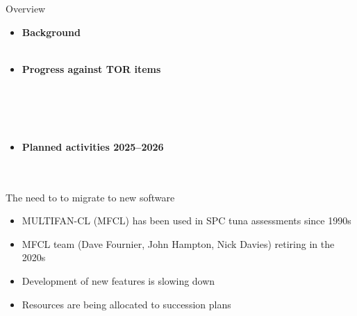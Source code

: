 \documentclass[aspectratio=169,fleqn]{beamer}
\begin{document}
\begin{frame}{Overview}
  \begin{itemize}
    \item[] {\bf\darkblue Background}\\[0.1ex]
    \\[4ex]
    \item[] {\bf\darkblue Progress against TOR items}\\[0.1ex]
    \\[0.1ex]
    \\[0.1ex]
    \\[0.1ex]
    \\[4ex]
    \item[] {\bf\darkblue Planned activities 2025--2026}\\[0.1ex]
    \\[0.1ex]
    \\[2ex]
  \end{itemize}
\end{frame}


\begin{frame}{The need to to migrate to new software}
  \begin{itemize}
    \item[] MULTIFAN-CL (MFCL) has been used in SPC tuna assessments since
    1990s\\[4ex]
    \item[] MFCL team (Dave Fournier, John Hampton, Nick Davies) retiring in the
    2020s\\[4ex]
    \item[] Development of new features is slowing down\\[4ex]
    \item[] Resources are being allocated to succession plans\\[2ex]
  \end{itemize}
\end{frame}
\end{document}
